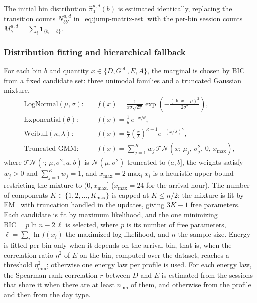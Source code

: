 \documentclass[journal]{IEEEtran}
\begin{document}
The initial bin distribution $\hat{\pi}_0^{u,d}(b)$ is estimated identically, replacing the transition counts $N_{bb'}^{u,d}$ in~\eqref{eq:jump-matrix-est} with the per-bin session counts $M_b^{u,d} = \sum_i \mathbf{1}_{\{b_i = b\}}$.


\subsubsection{Distribution fitting and hierarchical fallback}

For each bin $b$ and quantity $x \in \{D, G^{\mathrm{eff}}, E, A\}$, the marginal is chosen by BIC from a fixed candidate set: three unimodal families and a truncated Gaussian mixture,
\begin{align}
    \text{LogNormal}(\mu, \sigma)\!: \quad
    &f(x) = \frac{1}{x\sigma\sqrt{2\pi}}
    \exp\!\left(-\frac{(\ln x - \mu)^2}{2\sigma^2}\right),
    \nonumber \\
    \text{Exponential}(\theta)\!: \quad
    &f(x) = \frac{1}{\theta}\, e^{-x/\theta},
    \nonumber \\
    \text{Weibull}(\kappa, \lambda)\!: \quad
    &f(x) = \frac{\kappa}{\lambda}
    \left(\frac{x}{\lambda}\right)^{\kappa-1}
    e^{-(x/\lambda)^\kappa},
    \nonumber \\
    \text{Truncated GMM}\!: \quad
    &f(x) = \sum_{j=1}^{K} w_j\,
    \mathcal{TN}(x;\, \mu_j,\, \sigma_j^2,\, 0,\, x_{\max}),
    \label{eq:candidate-families}
\end{align}
where $\mathcal{TN}(\cdot;\, \mu, \sigma^2, a, b)$ is $\mathcal{N}(\mu, \sigma^2)$ truncated to $(a, b]$, the weights satisfy $w_j > 0$ and $\sum_{j=1}^{K} w_j = 1$, and $x_{\max} = 2\max_i x_i$ is a heuristic upper bound restricting the mixture to $(0, x_{\max}]$ ($x_{\max} = 24$ for the arrival hour). The number of components $K \in \{1, 2, \ldots, K_{\max}\}$ is capped at $K \le n/2$; the mixture is fit by EM~\cite{lee2012algorithms} with truncation handled in the updates, giving $3K - 1$ free parameters. Each candidate is fit by maximum likelihood, and the one minimizing $\mathrm{BIC} = p \ln n - 2\,\ell$ is selected, where $p$ is its number of free parameters, $\ell = \sum_i \ln f(x_i)$ the maximized log-likelihood, and $n$ the sample size. Energy is fitted per bin only when it depends on the arrival bin, that is, when the correlation ratio $\eta^2$ of $E$ on the bin, computed over the dataset, reaches a threshold $\eta^2_{\min}$; otherwise one energy law per profile is used. For each energy law, the Spearman rank correlation $r$ between $D$ and $E$ is estimated from the sessions that share it when there are at least $n_{\mathrm{bin}}$ of them, and otherwise from the profile and then from the day type.
\end{document}
